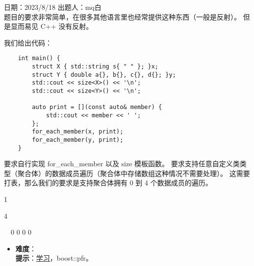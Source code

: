 日期：2023/8/18 出题人：mq白\\

题目的要求非常简单，在很多其他语言里也经常提供这种东西（一般是反射）。 但是显而易见 C++ 没有反射。

我们给出代码：

\begin{verbatim}
    int main() {
        struct X { std::string s{ " " }; }x;
        struct Y { double a{}, b{}, c{}, d{}; }y;
        std::cout << size<X>() << '\n';
        std::cout << size<Y>() << '\n';
    
        auto print = [](const auto& member) {
            std::cout << member << ' ';
        };
        for_each_member(x, print);
        for_each_member(y, print);
    }
\end{verbatim}

要求自行实现 for\_each\_member 以及 size 模板函数。 要求支持任意自定义类类型（聚合体）的数据成员遍历（聚合体中存储数组这种情况不需要处理）。 这需要打表，那么我们的要求是支持聚合体拥有 0 到 4 个数据成员的遍历。

\begin{tcolorbox}[title = {要求运行结果},
    fonttitle = \bfseries, fontupper = \sffamily, fontlower = \itshape]
    1           

    4           

    ~~0 0 0 0
\end{tcolorbox}

\begin{itemize}
\item \textbf{难度}：  \\
      \textbf{提示}：\href{https://akrzemi1.wordpress.com/2020/10/01/reflection-for-aggregates/}{学习}，boost::pfr。
\end{itemize}